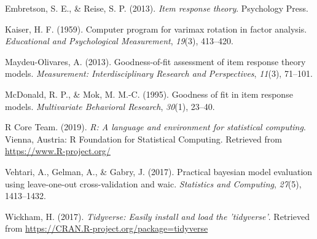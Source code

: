 \documentclass[10pt, letterpaper]{article}
\begin{document}
\leavevmode\hypertarget{ref-embretson2013item}{}%
Embretson, S. E., \& Reise, S. P. (2013). \emph{Item response theory}.
Psychology Press.

\leavevmode\hypertarget{ref-kaiser1959computer}{}%
Kaiser, H. F. (1959). Computer program for varimax rotation in factor
analysis. \emph{Educational and Psychological Measurement},
\emph{19}(3), 413--420.

\leavevmode\hypertarget{ref-maydeu2013goodness}{}%
Maydeu-Olivares, A. (2013). Goodness-of-fit assessment of item response
theory models. \emph{Measurement: Interdisciplinary Research and
Perspectives}, \emph{11}(3), 71--101.

\leavevmode\hypertarget{ref-mcdonald1995goodness}{}%
McDonald, R. P., \& Mok, M. M.-C. (1995). Goodness of fit in item
response models. \emph{Multivariate Behavioral Research}, \emph{30}(1),
23--40.

\leavevmode\hypertarget{ref-rcore}{}%
R Core Team. (2019). \emph{R: A language and environment for statistical
computing}. Vienna, Austria: R Foundation for Statistical Computing.
Retrieved from \url{https://www.R-project.org/}

\leavevmode\hypertarget{ref-vehtari2017practical}{}%
Vehtari, A., Gelman, A., \& Gabry, J. (2017). Practical bayesian model
evaluation using leave-one-out cross-validation and waic.
\emph{Statistics and Computing}, \emph{27}(5), 1413--1432.

\leavevmode\hypertarget{ref-tidy}{}%
Wickham, H. (2017). \emph{Tidyverse: Easily install and load the
'tidyverse'}. Retrieved from
\url{https://CRAN.R-project.org/package=tidyverse}


\end{document}
